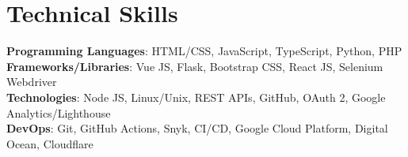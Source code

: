 \section{Technical Skills}
 \begin{itemize}[leftmargin=0.15in, label={}]
    \small{\item{
     \textbf{Programming Languages}{: HTML/CSS, JavaScript, TypeScript, Python, PHP} \\
     \textbf{Frameworks/Libraries}{: Vue JS, Flask, Bootstrap CSS, React JS, Selenium Webdriver} \\
     \textbf{Technologies}{: Node JS, Linux/Unix, REST APIs, GitHub, OAuth 2, Google Analytics/Lighthouse } \\
     \textbf{DevOps}{: Git, GitHub Actions, Snyk, CI/CD, Google Cloud Platform, Digital Ocean, Cloudflare }
    }}
 \end{itemize} 
